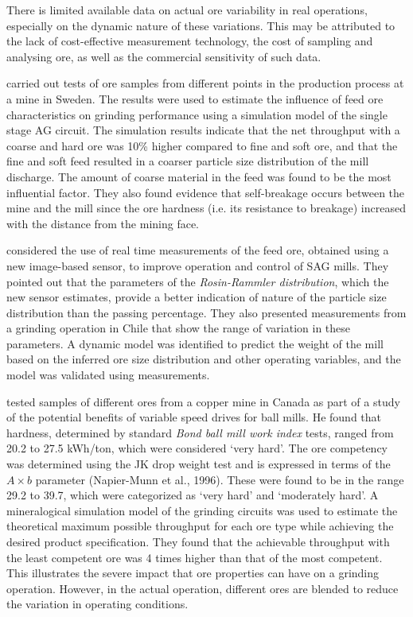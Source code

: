 There is limited available data on actual ore variability in real operations, especially on the dynamic nature of these variations. This may be attributed to the lack of cost-effective measurement technology, the cost of sampling and analysing ore, as well as the commercial sensitivity of such data.

\cite{hahne_ore_2003} carried out tests of ore samples from different points in the production process at a mine in Sweden. The results were used to estimate the influence of feed ore characteristics on grinding performance using a simulation model of the single stage \gls{AG} circuit. The simulation results indicate that the net throughput with a coarse and hard ore was 10\% higher compared to fine and soft ore, and that the fine and soft feed resulted in a coarser particle size distribution of the mill discharge. The amount of coarse material in the feed was found to be the most influential factor. They also found evidence that self-breakage occurs between the mine and the mill since the ore hardness (i.e. its resistance to breakage) increased with the distance from the mining face.

\cite{nunez_characterization_2011} considered the use of real time measurements of the feed ore, obtained using a new image-based sensor, to improve operation and control of \acrshort{SAG} mills. They pointed out that the parameters of the \textit{Rosin-Rammler distribution}, which the new sensor estimates, provide a better indication of nature of the particle size distribution than the passing percentage. They also presented measurements from a grinding operation in Chile that show the range of variation in these parameters. A dynamic model was identified to predict the weight of the mill based on the inferred ore size distribution and other operating variables, and the model was validated using measurements.

\cite{liu_development_2018} tested samples of different ores from a copper mine in Canada as part of a study of the potential benefits of variable speed drives for ball mills. He found that hardness, determined by standard \textit{Bond ball mill work index} tests, ranged from 20.2 to 27.5 \gls{kWh}/ton, which were considered `very hard'. The ore competency was determined using the JK drop weight test and is expressed in terms of the $A\times{b}$ parameter (Napier-Munn et al., 1996). These were found to be in the range 29.2 to 39.7, which were categorized as `very hard' and `moderately hard'. A mineralogical simulation model of the grinding circuits was used to estimate the theoretical maximum possible throughput for each ore type while achieving the desired product specification. They found that the achievable throughput with the least competent ore was 4 times higher than that of the most competent. This illustrates the severe impact that ore properties can have on a grinding operation. However, in the actual operation, different ores are blended to reduce the variation in operating conditions.

